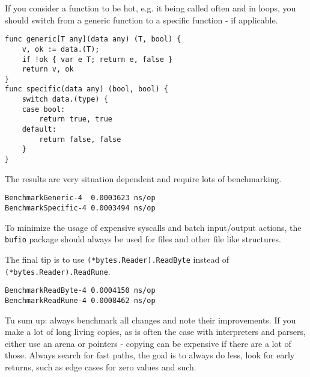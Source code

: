     If you consider a function to be hot, e.g. it being called often and in
    loops, you should switch from a generic function to a specific function -
    if applicable.

    \begin{verbatim}
func generic[T any](data any) (T, bool) {
    v, ok := data.(T);
    if !ok { var e T; return e, false }
    return v, ok
}
func specific(data any) (bool, bool) {
    switch data.(type) {
    case bool:
        return true, true
    default:
        return false, false
    }
}
    \end{verbatim}

    The results are very situation dependent and require lots of benchmarking.

    \begin{verbatim}
BenchmarkGeneric-4  0.0003623 ns/op
BenchmarkSpecific-4 0.0003494 ns/op
    \end{verbatim}

    To minimize the usage of expensive syscalls and batch input/output actions,
    the \texttt{bufio} package should always be used for files and other
    file like structures.

    The final tip is to use \texttt{(*bytes.Reader).ReadByte} instead of
    \texttt{(*bytes.Reader).ReadRune}.

    \begin{verbatim}
BenchmarkReadByte-4 0.0004150 ns/op
BenchmarkReadRune-4 0.0008462 ns/op
    \end{verbatim}

    Tu sum up: always benchmark all changes and note their improvements. If you
    make a lot of long living copies, as is often the case with interpreters
    and parsers, either use an arena or pointers - copying can be expensive if
    there are a lot of those. Always search for fast paths, the goal is to
    always do less, look for early returns, such as edge cases for zero values
    and such.


